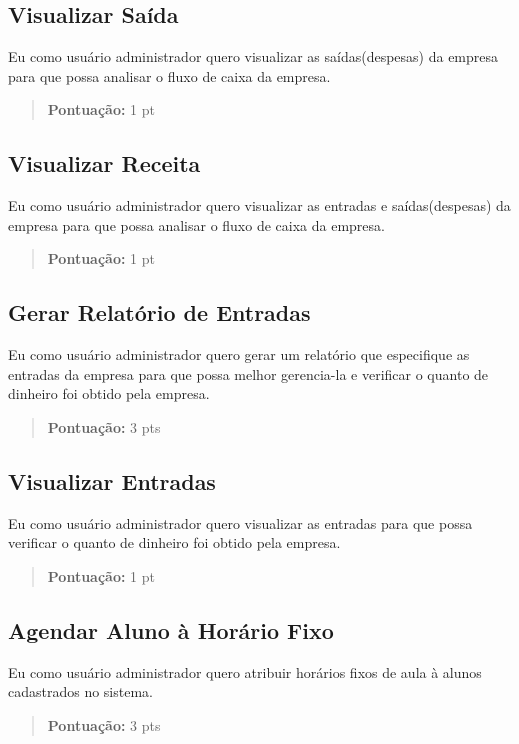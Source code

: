 \subsection[Visualizar Saída]{Visualizar Saída}
Eu como usuário administrador quero visualizar as saídas(despesas) da empresa
para que possa analisar o fluxo de caixa da empresa.
\begin{quote}
    \textbf{Pontuação:} 1 pt
\end{quote}

\subsection[Visualizar Receita]{Visualizar Receita}
Eu como usuário administrador quero visualizar as entradas e saídas(despesas) da empresa
para que possa analisar o fluxo de caixa da empresa.
\begin{quote}
    \textbf{Pontuação:} 1 pt
\end{quote}

\subsection[Gerar Relatório de Entradas]{Gerar Relatório de Entradas}
Eu como usuário administrador quero gerar um relatório que especifique as
entradas da empresa para que possa melhor gerencia-la e verificar o quanto de
dinheiro foi obtido pela empresa.
\begin{quote}
    \textbf{Pontuação:} 3 pts
\end{quote}

\subsection[Visualizar Entradas]{Visualizar Entradas}
Eu como usuário administrador quero visualizar as entradas para que possa
verificar o quanto de dinheiro foi obtido pela empresa.
\begin{quote}
    \textbf{Pontuação:} 1 pt
\end{quote}

\subsection[Agendar Aluno à Horário Fixo]{Agendar Aluno à Horário Fixo}
Eu como usuário administrador quero atribuir horários fixos de aula à alunos
cadastrados no sistema.
\begin{quote}
    \textbf{Pontuação:} 3 pts
\end{quote}

